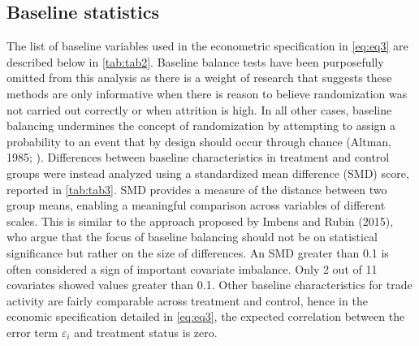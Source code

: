 \documentclass[12pt]{article}
\begin{document}
\subsection{Baseline statistics}
The list of baseline variables used in the econometric specification in \autoref{eq:eq3} are described below in \autoref{tab:tab2}. Baseline balance tests have been purposefully omitted from this analysis as there is a weight of research that suggests these methods are only informative when there is reason to believe randomization was not carried out correctly or when attrition is high. In all other cases, baseline balancing undermines the concept of randomization by attempting to assign a probability to an event that by design should occur through chance (Altman, 1985; \citep{bruhn2008pursuit}). Differences between baseline characteristics in treatment and control groups were instead analyzed using a standardized mean difference (SMD) score, reported in \autoref{tab:tab3}. SMD provides a measure of the distance between two group means, enabling a meaningful comparison across variables of different scales. This is similar to the approach proposed by Imbens and Rubin (2015), who argue that the focus of baseline balancing should not be on statistical significance but rather on the size of differences. An SMD greater than 0.1 is often considered a sign of important covariate imbalance. Only 2 out of 11 covariates showed values greater than 0.1. Other baseline characteristics for trade activity are fairly comparable across treatment and control, hence in the economic specification detailed in \autoref{eq:eq3}, the expected correlation between the error term $\varepsilon_i$ and treatment status is zero.
\end{document}
